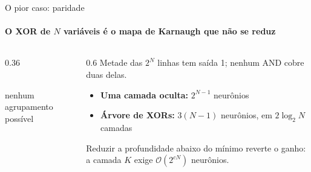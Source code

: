 \documentclass[aspectratio=169, 11pt]{beamer}
\begin{document}
\begin{frame}{O pior caso: paridade}
  \framesubtitle{O XOR de $N$ variáveis é o mapa de Karnaugh que não se reduz}

  \begin{columns}[T]
    \begin{column}{0.36\textwidth}
      \begin{center}
        \\[2pt]
        {\small\color{icCinza} nenhum agrupamento possível}
      \end{center}
    \end{column}
    \begin{column}{0.6\textwidth}
      Metade das $2^N$ linhas tem saída 1; nenhum AND cobre duas delas.

      \smallskip
      \begin{itemize}\setlength{\itemsep}{0.3ex}
        \item \textbf{Uma camada oculta:} $2^{N-1}$ neurônios
        \item \textbf{Árvore de XORs:} $3(N-1)$ neurônios,
              em $2\log_2 N$ camadas
      \end{itemize}

      \medskip

      \smallskip
      {\small Reduzir a profundidade abaixo do mínimo reverte o ganho: a
      camada $K$ exige $\mathcal{O}(2^{cN})$ neurônios.}
    \end{column}
  \end{columns}
\end{frame}
\end{document}
